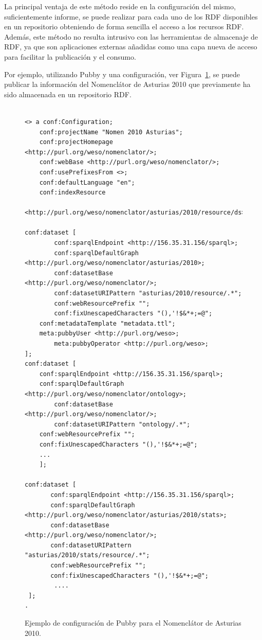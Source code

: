 La principal ventaja de este método reside en la configuración del mismo, suficientemente informe, se puede
realizar para cada uno de los \dataset RDF disponibles en un repositorio obteniendo
de forma sencilla el acceso a los recursos RDF. Además, este método no resulta intrusivo
con las herramientas de almacenaje de RDF, ya que son aplicaciones externas añadidas como una capa nueva de acceso para facilitar 
la publicación y el consumo.

Por ejemplo, utilizando \gls{Pubby} y una configuración, ver Figura~\ref{fig:nomen-pubby}, se puede 
publicar la información del Nomenclátor de Asturias 2010 que previamente ha sido almacenada
en un repositorio RDF.

\begin{figure}[!htp]
\begin{lstlisting}

<> a conf:Configuration;
    conf:projectName "Nomen 2010 Asturias";
    conf:projectHomepage <http://purl.org/weso/nomenclator/>;
    conf:webBase <http://purl.org/weso/nomenclator/>;
    conf:usePrefixesFrom <>;
    conf:defaultLanguage "en";
    conf:indexResource 
      <http://purl.org/weso/nomenclator/asturias/2010/resource/ds>;

conf:dataset [
        conf:sparqlEndpoint <http://156.35.31.156/sparql>;
        conf:sparqlDefaultGraph <http://purl.org/weso/nomenclator/asturias/2010>;
        conf:datasetBase <http://purl.org/weso/nomenclator/>;
        conf:datasetURIPattern "asturias/2010/resource/.*";
        conf:webResourcePrefix "";
        conf:fixUnescapedCharacters "(),'!$&*+;=@";
	conf:metadataTemplate "metadata.ttl";
	meta:pubbyUser <http://purl.org/weso>;
        meta:pubbyOperator <http://purl.org/weso>;
];
conf:dataset [
	conf:sparqlEndpoint <http://156.35.31.156/sparql>;
	conf:sparqlDefaultGraph <http://purl.org/weso/nomenclator/ontology>;
        conf:datasetBase <http://purl.org/weso/nomenclator/>;
        conf:datasetURIPattern "ontology/.*";
	conf:webResourcePrefix "";
	conf:fixUnescapedCharacters "(),'!$&*+;=@";
	...
    ];

conf:dataset [
       conf:sparqlEndpoint <http://156.35.31.156/sparql>;
       conf:sparqlDefaultGraph <http://purl.org/weso/nomenclator/asturias/2010/stats>;
       conf:datasetBase <http://purl.org/weso/nomenclator/>;
       conf:datasetURIPattern "asturias/2010/stats/resource/.*";
       conf:webResourcePrefix "";
       conf:fixUnescapedCharacters "(),'!$&*+;=@";
        ....
 ];
.
\end{lstlisting}
	\caption{Ejemplo de configuración de Pubby para el Nomenclátor de Asturias 2010.}
	\label{fig:nomen-pubby}
\end{figure}


